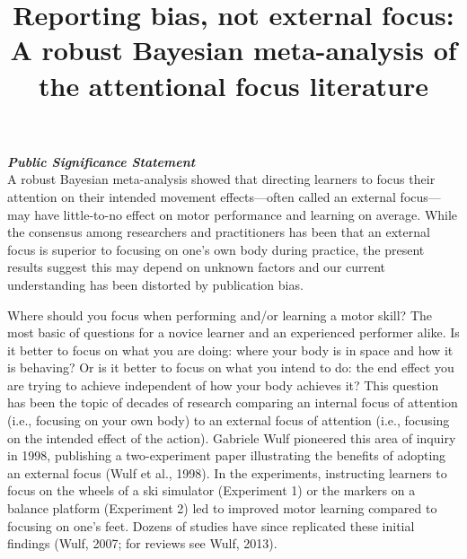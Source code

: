 \documentclass[
  man, donotrepeattitle,floatsintext]{apa7}
\title{Reporting bias, not external focus: A robust Bayesian meta-analysis of the attentional focus literature}
\author{\textsuperscript{}}
\date{}
\affiliation{\phantom{0}}
\begin{document}
\maketitle

\noindent \textbf{\emph{Public Significance Statement}}\\
\noindent A robust Bayesian meta-analysis showed that directing learners to focus their attention on their intended movement effects---often called an external focus---may have little-to-no effect on motor performance and learning on average. While the consensus among researchers and practitioners has been that an external focus is superior to focusing on one's own body during practice, the present results suggest this may depend on unknown factors and our current understanding has been distorted by publication bias.

\newpage

Where should you focus when performing and/or learning a motor skill? The most basic of questions for a novice learner and an experienced performer alike. Is it better to focus on what you are doing: where your body is in space and how it is behaving? Or is it better to focus on what you intend to do: the end effect you are trying to achieve independent of how your body achieves it? This question has been the topic of decades of research comparing an internal focus of attention (i.e., focusing on your own body) to an external focus of attention (i.e., focusing on the intended effect of the action). Gabriele Wulf pioneered this area of inquiry in 1998, publishing a two-experiment paper illustrating the benefits of adopting an external focus (Wulf et al., 1998). In the experiments, instructing learners to focus on the wheels of a ski simulator (Experiment 1) or the markers on a balance platform (Experiment 2) led to improved motor learning compared to focusing on one's feet. Dozens of studies have since replicated these initial findings (Wulf, 2007; for reviews see Wulf, 2013).
\end{document}
